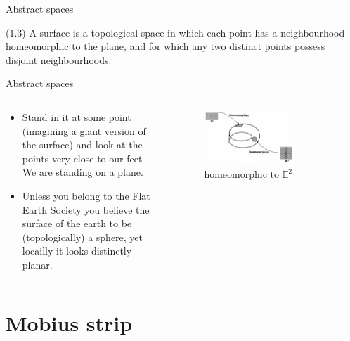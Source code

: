 \documentclass{beamer}
\begin{document}
\begin{frame}{Abstract spaces}
  \begin{definition}[Surface]
    (1.3) A surface is a topological space in which each point has a neighbourhood homeomorphic to the plane, and for which any two distinct points possess disjoint neighbourhoods.
  \end{definition}
\end{frame}

\begin{frame}{Abstract spaces}
  \begin{columns}
    \begin{column}{0.5\textwidth}
      \begin{definition}[Surface]
        \begin{itemize}
        \item Stand in it at some point (imagining a giant version of the surface) and look at the points very close to our feet - We are standing on a plane.
        \item Unless you belong to the Flat Earth Society you believe the surface of the earth to be (topologically) a sphere, yet locailly it looks distinctly planar.
        \end{itemize}
      \end{definition}
    \end{column}
    \begin{column}{0.5\textwidth}
      \begin{figure}
        \centering
        \includegraphics[width=0.7\textwidth]{figure_1_16.png}
        \caption{homeomorphic to $\mathbb{E}^2$}
      \end{figure}
    \end{column}
  \end{columns}
\end{frame}

\section{Mobius strip}
\end{document}
